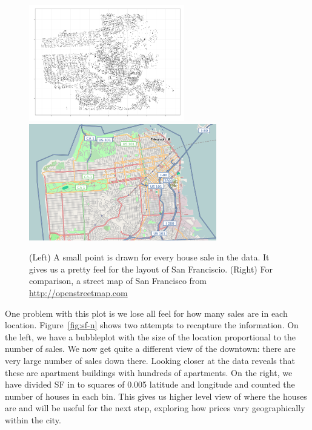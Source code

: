 \documentclass[oneside]{article}
\begin{document}
\begin{figure}[htbp]
  \centering
  \includegraphics[height=2in]{sf-geo}%
  \includegraphics[height=2in]{sf-map}
  \caption{(Left) A small point is drawn for every house sale in the data.  It gives us a pretty feel for the layout of San Franciscio. (Right) For comparison, a street map of San Francisco from \url{http://openstreetmap.com}}
  \label{fig:sf-geo}
\end{figure}

One problem with this plot is we lose all feel for how many sales are in each location.  Figure~\ref{fig:sf-n} shows two attempts to recapture the information.  On the left, we have a bubbleplot with the size of the location proportional to the number of sales.  We now get quite a different view of the downtown: there are very large number of sales down there.  Looking closer at the data reveals that these are apartment buildings with hundreds of apartments.  On the right, we have divided SF in to squares of 0.005 latitude and longitude and counted the number of houses in each bin.  This gives us higher level view of where the houses are and will be useful for the next step, exploring how prices vary geographically within the city.
\end{document}
